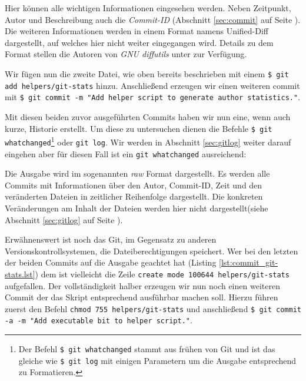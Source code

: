 

Hier können alle wichtigen Informationen eingesehen werden. Neben Zeitpunkt,
Autor und Beschreibung auch die \textit{Commit-ID} (Abschnitt \ref{sec:commit}
auf Seite \pageref{sec:commit}). Die weiteren Informationen werden in einem
Format namens Unified-Diff dargestellt, auf welches hier nicht weiter
eingegangen wird. Details zu dem Format stellen die Autoren von \textit{GNU
diffutils} unter \cite[S.~12-13]{paper:diffutils} zur Verfügung.

Wir fügen nun die zweite Datei, wie oben bereits beschrieben mit einem
\texttt{\$ git add helpers/git-stats} hinzu. Anschließend erzeugen wir einen
weiteren \gls{commit} mit \texttt{\$ git commit -m "Add helper script to
generate author statistics."}.



Mit diesen beiden zuvor ausgeführten Commits haben wir nun eine, wenn auch
kurze, Historie erstellt. Um diese zu untersuchen dienen die Befehle
\texttt{\$ git whatchanged}\footnote{Der Befehl \texttt{\$ git whatchanged} stammt
aus frühen von Git und ist das gleiche wie \texttt{\$ git log} mit einigen
Parametern um die Ausgabe entsprechend zu Formatieren.} oder \texttt{git log}.
Wir werden in Abschnitt \ref{sec:gitlog} weiter darauf eingehen aber für diesen
Fall ist ein \texttt{git whatchanged} ausreichend:



Die Ausgabe wird im sogenannten \textit{raw} Format dargestellt. Es werden alle
Commits mit Informationen über den Autor, Commit-ID, Zeit und den veränderten
Dateien in zeitlicher Reihenfolge dargestellt. Die konkreten Veränderungen am
Inhalt der Dateien werden hier nicht dargestellt(siehe Abschnitt
\ref{sec:gitlog} auf Seite \pageref{sec:gitlog}).

Erwähnenswert ist noch das Git, im Gegensatz zu anderen
Versionskontrollsystemen, die Dateiberechtigungen speichert. Wer bei den
letzten der beiden Commits auf die Ausgabe geachtet hat (Listing
\ref{lst:commit_git-stats.lst}) dem ist vielleicht die Zeile \texttt{create
mode 100644 helpers/git-stats} aufgefallen. Der vollständigkeit halber erzeugen
wir nun noch einen weiteren Commit der das Skript entsprechend ausführbar
machen soll. Hierzu führen zuerst den Befehl \texttt{chmod 755
helpers/git-stats} und anschließend \texttt{\$ git commit -a -m "Add executable
bit to helper script."}.

